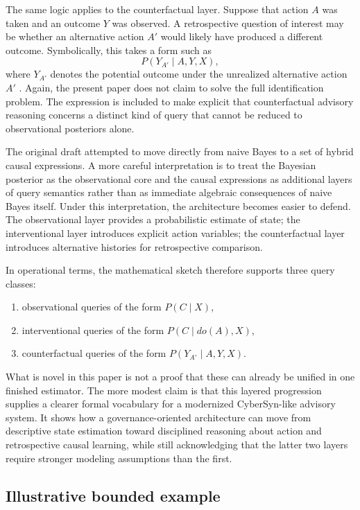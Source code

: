 \documentclass[11pt]{article}
\begin{document}
The same logic applies to the counterfactual layer. Suppose that action $A$ was taken and an outcome $Y$ was observed. A retrospective question of interest may be whether an alternative action $A'$ would likely have produced a different outcome. Symbolically, this takes a form such as
\begin{equation}
P(Y_{A'} \mid A, Y, X),
\end{equation}
where $Y_{A'}$ denotes the potential outcome under the unrealized alternative action $A'$ \citep{pearl2000}. Again, the present paper does not claim to solve the full identification problem. The expression is included to make explicit that counterfactual advisory reasoning concerns a distinct kind of query that cannot be reduced to observational posteriors alone.

The original draft attempted to move directly from naive Bayes to a set of hybrid causal expressions. A more careful interpretation is to treat the Bayesian posterior as the observational core and the causal expressions as additional layers of query semantics rather than as immediate algebraic consequences of naive Bayes itself. Under this interpretation, the architecture becomes easier to defend. The observational layer provides a probabilistic estimate of state; the interventional layer introduces explicit action variables; the counterfactual layer introduces alternative histories for retrospective comparison.

In operational terms, the mathematical sketch therefore supports three query classes:
\begin{enumerate}
\item observational queries of the form $P(C \mid X)$,
\item interventional queries of the form $P(C \mid do(A), X)$,
\item counterfactual queries of the form $P(Y_{A'} \mid A, Y, X)$.
\end{enumerate}
What is novel in this paper is not a proof that these can already be unified in one finished estimator. The more modest claim is that this layered progression supplies a clearer formal vocabulary for a modernized CyberSyn-like advisory system. It shows how a governance-oriented architecture can move from descriptive state estimation toward disciplined reasoning about action and retrospective causal learning, while still acknowledging that the latter two layers require stronger modeling assumptions than the first.

\subsection*{Illustrative bounded example}
\end{document}

